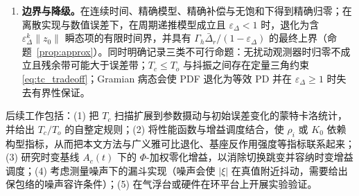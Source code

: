 \begin{enumerate}
  \item \textbf{边界与降级。}在连续时间、精确模型、精确补偿与无饱和下得到精确归零；在离散实现与数值误差下，在周期递推模型成立且 \(\varepsilon_\Delta<1\) 时，退化为含 \(\varepsilon_\Delta^k\lVert z_0\rVert\) 瞬态项的有限时间界，并具有 \(\Gamma_h\bar\Delta_r/(1-\varepsilon_\Delta)\) 的最终上界（命题~\ref{prop:approx}）。同时明确记录三类不可行命题：无扰动观测器时归零不成立且残余带可能大于误差带；\(T_c\le T_o\) 与抖振之间存在定量三角约束 \eqref{eq:tc_tradeoff}；Gramian 病态会使 PDF 退化为等效 PD 并在 \(\varepsilon_\Delta\ge1\) 时失去有界性保证。
\end{enumerate}

后续工作包括：\textup{(1)} 把 \(T_c\) 扫描扩展到参数摄动与初始误差变化的蒙特卡洛统计，并给出 \(T_c/T_o\) 的自整定规则；\textup{(2)} 将性能函数与增益调度结合，使 \(\rho_i\) 或 \(K_0\) 依赖构型指标，从而把本文方法与广义雅可比退化、基座反作用强度等指标联系起来；\textup{(3)} 研究时变基线 \(A_c(t)\) 下的 \(\Phi\)-加权零化增益，以消除切换跳变并容纳时变增益调度；\textup{(4)} 考虑测量噪声下的漏斗实现（噪声会使 \(\lvert\xi\rvert\) 在真值附近抖动，需要给出保包络的噪声容许条件）；\textup{(5)} 在气浮台或硬件在环平台上开展实验验证。
